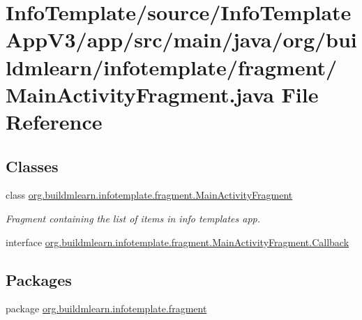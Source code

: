 \hypertarget{InfoTemplate_2source_2InfoTemplateAppV3_2app_2src_2main_2java_2org_2buildmlearn_2infotemplate_2fcc5a6e7e0c3e52d3892aebb1b333ffde}{}\section{Info\+Template/source/\+Info\+Template\+App\+V3/app/src/main/java/org/buildmlearn/infotemplate/fragment/\+Main\+Activity\+Fragment.java File Reference}
\label{InfoTemplate_2source_2InfoTemplateAppV3_2app_2src_2main_2java_2org_2buildmlearn_2infotemplate_2fcc5a6e7e0c3e52d3892aebb1b333ffde}
\subsection*{Classes}
\begin{DoxyCompactItemize}
\item 
class \hyperlink{classorg_1_1buildmlearn_1_1infotemplate_1_1fragment_1_1MainActivityFragment}{org.\+buildmlearn.\+infotemplate.\+fragment.\+Main\+Activity\+Fragment}
\begin{DoxyCompactList}\small\item\em Fragment containing the list of items in info template\textquotesingle{}s app. \end{DoxyCompactList}\item 
interface \hyperlink{interfaceorg_1_1buildmlearn_1_1infotemplate_1_1fragment_1_1MainActivityFragment_1_1Callback}{org.\+buildmlearn.\+infotemplate.\+fragment.\+Main\+Activity\+Fragment.\+Callback}
\end{DoxyCompactItemize}
\subsection*{Packages}
\begin{DoxyCompactItemize}
\item 
package \hyperlink{namespaceorg_1_1buildmlearn_1_1infotemplate_1_1fragment}{org.\+buildmlearn.\+infotemplate.\+fragment}
\end{DoxyCompactItemize}
